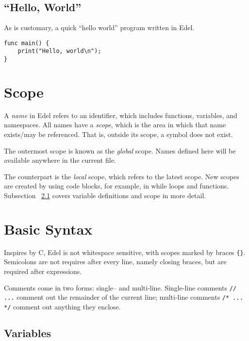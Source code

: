 \documentclass{article}
\begin{document}
    \subsection{``Hello, World''}\label{subsec:hello-world}

    As is customary, a quick ``hello world'' program written in Edel.

    \begin{lstlisting}[language=CustomLang]
func main() {
    print("Hello, world\n");
}
    \end{lstlisting}

    \section{Scope}

    A \textit{name} in Edel refers to an identifier, which includes functions, variables, and namespaces.
    All names have a \textit{scope}, which is the area in which that name exists/may be referenced.
    That is, outside its scope, a symbol does not exist.

    The outermost scope is known as the \textit{global} scope.
    Names defined here will be available anywhere in the current file.

    The counterpart is the \textit{local} scope, which refers to the latest scope.
    New scopes are created by using code blocks, for example, in while loops and functions.
    Subsection ~\ref{subsec:variables} covers variable definitions and scope in more detail.



    \section{Basic Syntax}\label{sec:basic-syntax}

    Inspires by C, Edel is not whitespace sensitive, with scopes marked by braces \texttt{\{\}}.
    Semicolons are not requires after every line, namely closing braces, but are required after expressions.

    Comments come in two forms: single-- and multi-line.
    Single-line comments \texttt{// ...} comment out the remainder of the current line;
    multi-line comments \texttt{/* ... */} comment out anything they enclose.

    \subsection{Variables}\label{subsec:variables}
\end{document}
